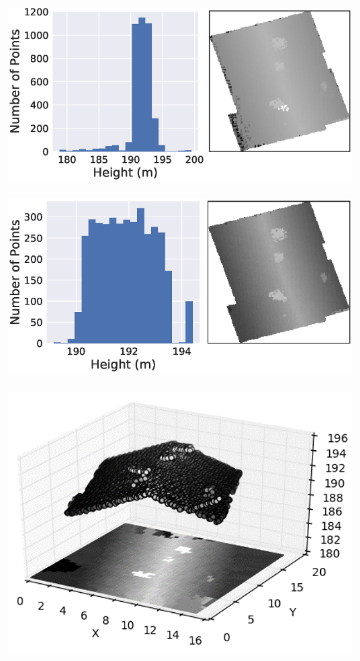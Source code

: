 \begin{figure}[t]

\centering
    \begin{minipage}{0.45\linewidth}
       \begin{subfigure}[b]{\textwidth}
           \includegraphics[width=\linewidth]{chapter_4_roofshape/imgs/before_filter.eps}
           \caption{}
           \label{fig:lidar_filt_before} 
        \end{subfigure}
        \begin{subfigure}[b]{\linewidth}
           \includegraphics[width=\linewidth]{chapter_4_roofshape/imgs/after_filter.eps}
           \caption{}
           \label{fig:lidar_filt_after}
        \end{subfigure}
    \end{minipage}
    \hfil
    \begin{minipage}{0.45\linewidth}
       \begin{subfigure}[b]{\textwidth}
           \includegraphics[width=\linewidth]{chapter_4_roofshape/imgs/lidar_projection.png}

\end{subfigure}
\end{minipage}
\end{figure}

